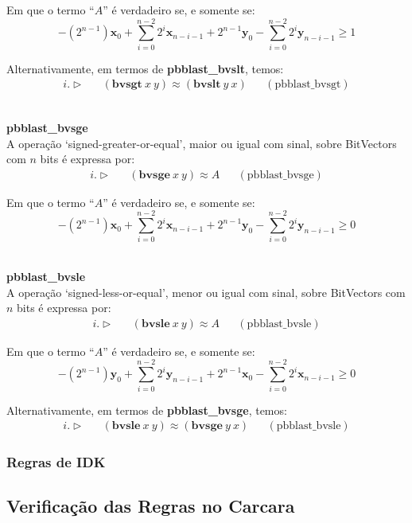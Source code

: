 \documentclass[conference]{IEEEtran}
\begin{document}
Em que o termo ``$A$'' é verdadeiro se, e somente se:
\[
    -(2^{n-1})\mathbf{x}_0 + \sum_{i=0}^{n-2} 2^i\mathbf{x}_{n-i-1} + 2^{n-1} \mathbf{y}_{0} - \sum_{i=0}^{n-2} 2^i\mathbf{y}_{n-i-1} \geq 1
\]

Alternativamente, em termos de \textbf{pbblast\_bvslt}, temos:
\begin{align*}
    i. \vartriangleright &  & (\textbf{bvsgt}\ x\ y) \approx (\textbf{bvslt}\ y\ x) &  & (\text{pbblast\_bvsgt})
\end{align*}

\noindent\\
\textbf{pbblast\_bvsge}\\
A operação `signed-greater-or-equal', maior ou igual com sinal, sobre BitVectors com $n$ bits é expressa por:
\begin{align*}
    i. \vartriangleright &  & (\textbf{bvsge}\ x\ y) \approx A &  & (\text{pbblast\_bvsge})
\end{align*}

Em que o termo ``$A$'' é verdadeiro se, e somente se:
\[
    -(2^{n-1})\mathbf{x}_{0} + \sum_{i=0}^{n-2} 2^i\mathbf{x}_{n-i-1} + 2^{n-1}\mathbf{y}_{0} - \sum_{i=0}^{n-2} 2^i\mathbf{y}_{n-i-1} \geq 0
\]

\noindent\\
\textbf{pbblast\_bvsle}\\
A operação `signed-less-or-equal', menor ou igual com sinal, sobre BitVectors com $n$ bits é expressa por:
\begin{align*}
    i. \vartriangleright &  & (\textbf{bvsle}\ x\ y) \approx A &  & (\text{pbblast\_bvsle})
\end{align*}

Em que o termo ``$A$'' é verdadeiro se, e somente se:
\[
    -(2^{n-1})\mathbf{y}_{0} + \sum_{i=0}^{n-2} 2^i\mathbf{y}_{n-i-1} + 2^{n-1}\mathbf{x}_{0} - \sum_{i=0}^{n-2} 2^i\mathbf{x}_{n-i-1} \geq 0
\]

Alternativamente, em termos de \textbf{pbblast\_bvsge}, temos:
\begin{align*}
    i. \vartriangleright &  & (\textbf{bvsle}\ x\ y) \approx (\textbf{bvsge}\ y\ x) &  & (\text{pbblast\_bvsle})
\end{align*}


\subsubsection{Regras de IDK}

\subsection{Verificação das Regras no Carcara}
\end{document}
